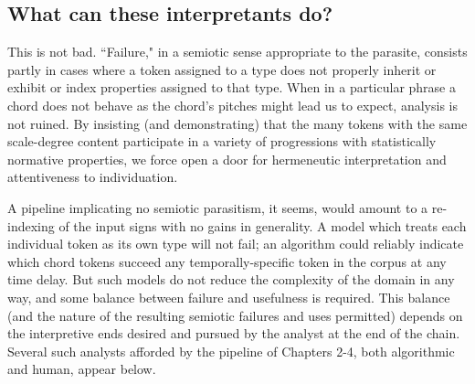 \subsection{What can these interpretants do?}
This is not bad.  ``Failure," in a semiotic sense appropriate to the parasite, consists partly in cases where a token assigned to a type does not properly inherit or exhibit or index properties assigned to that type.  When in a particular phrase a chord does not behave as the chord's pitches might lead us to expect, analysis is not ruined.  By insisting (and demonstrating) that the many tokens with the same scale-degree content participate in a variety of progressions with statistically normative properties, we force open a door for hermeneutic interpretation and attentiveness to individuation.

A pipeline implicating no semiotic parasitism, it seems, would amount to a re-indexing of the input signs with no gains in generality.  A model which treats each individual token as its own type will not fail; an algorithm could reliably indicate which chord tokens succeed any temporally-specific token in the corpus at any time delay.  But such models do not reduce the complexity of the domain in any way, and some balance between failure and usefulness is required.  This balance (and the nature of the resulting semiotic failures and uses permitted) depends on the interpretive ends desired and pursued by the analyst at the end of the chain.  Several such analysts afforded by the pipeline of Chapters 2-4, both algorithmic and human, appear below.

